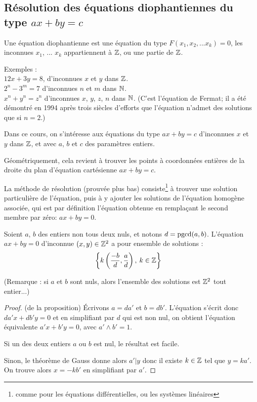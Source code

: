 \subsection{Résolution des équations diophantiennes du type $ax+by=c$}


\begin{definition}
Une équation diophantienne est une équation du type $F(x_1, x_2, ...x_k)=0$, les inconnues $x_1$, ... $x_k$ appartiennent à $\mathbb{Z}$, ou une partie de $\mathbb{Z}$.
\end{definition}

Exemples :\\
$12x+3y=8$, d'inconnues $x$ et $y$ dans $\mathbb{Z}$.\\
$2^n-3^m=7$ d'inconnues $n$ et $m$ dans $\mathbb{N}$.\\
$x^n+y^n=z^n$ d'inconnues $x$, $y$, $z$, $n$ dans $\mathbb{N}$. (C'est l'équation de Fermat; il a été démontré en 1994 après trois siècles d'efforts que l'équation n'admet des solutions que si $n=2$.)

Dans ce cours, on s'intéresse aux équations du type $ax+by=c$ d'inconnues $x$ et $y$ dans $\mathbb{Z}$, et avec $a$, $b$ et $c$ des paramètres entiers. 

Géométriquement, cela revient à trouver les points à coordonnées entières de la droite du plan d'équation cartésienne $ax+by=c$.

La méthode de résolution (prouvée plus bas) consiste\footnote{comme pour les équations différentielles, ou les systèmes linéaires} à trouver une solution particulière de l'équation, puis à y ajouter les solutions de l'équation homogène associée, qui est par définition l'équation obtenue en remplaçant le second membre par zéro: $ax+by=0$.

\begin{proposition}
Soient $a$, $b$ des entiers non tous deux  nuls, et notons $d = \operatorname{pgcd}(a,b)$. L'équation $ax+by=0$ d'inconnue $(x,y)\in \mathbb{Z}^2$ a pour ensemble de solutions :
\[
\left\{k\left(\frac{-b}{d} , \frac{a}{d}\right),\: k\in \mathbb{Z}\right\}
\]
\end{proposition}

(Remarque : si $a$ et $b$ sont nuls, alors l'ensemble des solutions est $\mathbb{Z}^2$ tout entier...)

\begin{proof}(de la proposition)
\'Ecrivons $a=da'$ et $b=db'$. L'équation s'écrit donc $da'x+db'y=0$ et en simplifiant par $d$ qui est non nul, on obtient l'équation équivalente $a'x+b'y=0$, avec $a'\wedge b'=1$.

Si un des deux entiers $a$ ou $b$ est nul, le résultat est facile.

Sinon, le théorème de Gauss donne alors $a'|y$ donc il existe $k\in \mathbb{Z}$ tel que $y = ka'$.  On trouve alors $x=-kb'$ en simplifiant par $a'$.
\end{proof}

